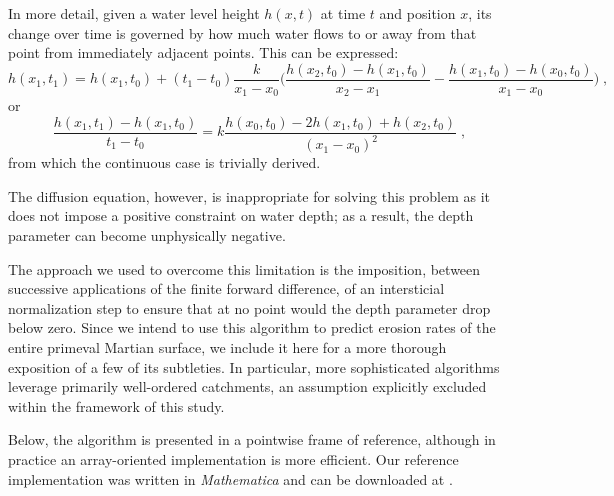 \documentclass[12pt]{iopart}
\numberwithin{equation}{section}
\begin{document}
In more detail, given a water level height $h(x,t)$ at time $t$ and position $x$, its change over time is governed by how much water flows to or away from that point from immediately adjacent points. This can be expressed:
\[h(x_1,t_1)=h(x_1,t_0) + (t_1-t_0) \frac{k}{x_1-x_0} \bigg(\frac{h(x_2,t_0)-h(x_1,t_0)}{x_2-x_1}-\frac{h(x_1,t_0)-h(x_0,t_0)}{x_1-x_0}\bigg)\;,\] or 
\[\frac{h(x_1,t_1)-h(x_1,t_0)}{t_1-t_0} = k \frac{h(x_0,t_0)-2h(x_1,t_0)+h(x_2,t_0)}{(x_1-x_0)^2}\;,\]
from which the continuous case is trivially derived.

The diffusion equation, however, is inappropriate for solving this problem as it does not impose a positive constraint on water depth; as a result, the depth parameter can become unphysically negative.

The approach we used to overcome this limitation is the imposition, between successive applications of the finite forward difference, of an intersticial normalization step to ensure that at no point would the depth parameter drop below zero. Since we intend to use this algorithm to predict erosion rates of the entire primeval Martian surface, we include it here for a more thorough exposition of a few of its subtleties. In particular, more sophisticated algorithms leverage primarily well-ordered catchments, an assumption explicitly excluded within the framework of this study.

Below, the algorithm is presented in a pointwise frame of reference, although in practice an array-oriented implementation is more efficient. Our reference implementation was written in {\it Mathematica} and can be downloaded at \cite{code}.
\end{document}
